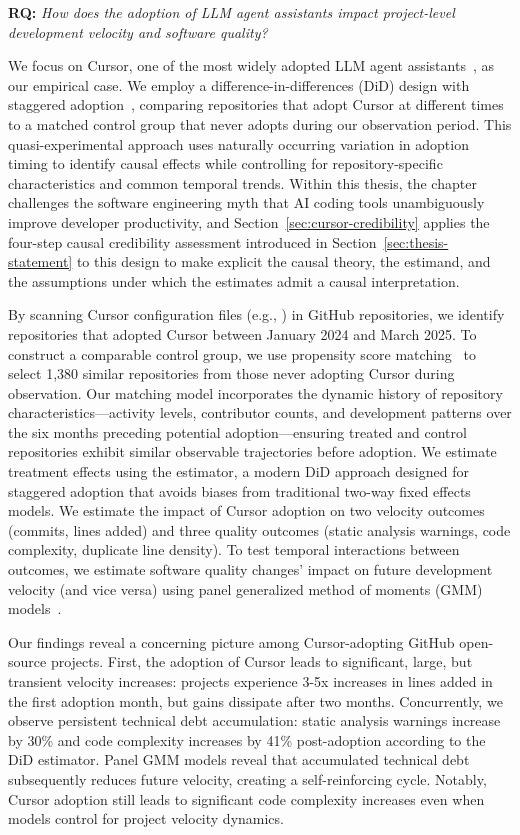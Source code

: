 \textbf{RQ:} \emph{How does the adoption of LLM agent assistants impact project-level development velocity and software quality?}

We focus on Cursor, one of the most widely adopted LLM agent assistants~\cite{global-ai-trends}, as our empirical case.
We employ a difference-in-differences (DiD) design with staggered adoption~\cite{callaway2021difference, borusyak2024revisiting}, comparing repositories that adopt Cursor at different times to a matched control group that never adopts during our observation period.
This quasi-experimental approach uses naturally occurring variation in adoption timing to identify causal effects while controlling for repository-specific characteristics and common temporal trends.
Within this thesis, the chapter challenges the software engineering myth that AI coding tools unambiguously improve developer productivity, and Section~\ref{sec:cursor-credibility} applies the four-step causal credibility assessment introduced in Section~\ref{sec:thesis-statement} to this design to make explicit the causal theory, the estimand, and the assumptions under which the estimates admit a causal interpretation.

By scanning Cursor configuration files (e.g., ) in GitHub repositories, we identify \numtreated repositories that adopted Cursor between January 2024 and March 2025.
To construct a comparable control group, we use propensity score matching~\cite{austin2011introduction} to select 1,380 similar repositories from those never adopting Cursor during observation.
Our matching model incorporates the dynamic history of repository characteristics---activity levels, contributor counts, and development patterns over the six months preceding potential adoption---ensuring treated and control repositories exhibit similar observable trajectories before adoption.
We estimate treatment effects using the \citet{borusyak2024revisiting} estimator, a modern DiD approach designed for staggered adoption that avoids biases from traditional two-way fixed effects models.
We estimate the impact of Cursor adoption on two velocity outcomes (commits, lines added) and three quality outcomes (static analysis warnings, code complexity, duplicate line density).
To test temporal interactions between outcomes, we estimate software quality changes' impact on future development velocity (and vice versa) using panel generalized method of moments (GMM) models~\cite{arellano1991some}.

Our findings reveal a concerning picture among Cursor-adopting GitHub open-source projects.
First, the adoption of Cursor leads to significant, large, but transient velocity increases: projects experience 3-5x increases in lines added in the first adoption month, but gains dissipate after two months.
Concurrently, we observe persistent technical debt accumulation: static analysis warnings increase by 30\% and code complexity increases by 41\% post-adoption according to the \citet{borusyak2024revisiting} DiD estimator.
Panel GMM models reveal that accumulated technical debt subsequently reduces future velocity, creating a self-reinforcing cycle.
Notably, Cursor adoption still leads to significant code complexity increases even when models control for project velocity dynamics.

